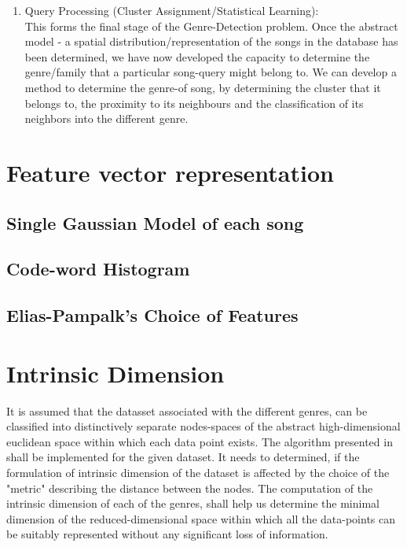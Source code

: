 \documentclass[12pt]{article}
\begin{document}
\begin{enumerate}
\item Query Processing (Cluster Assignment/Statistical Learning):\\
This forms the final stage of the Genre-Detection problem. Once the abstract model - a spatial distribution/representation of the songs in the database has been determined, we have now developed the capacity to determine the genre/family that a particular song-query might belong to. We can develop a method to determine the genre-of song, by determining the cluster that it belongs to, the proximity to its neighbours and the classification of its neighbors into the different genre. 


\end{enumerate}

\section{Feature vector representation}

\subsection{Single Gaussian Model of each song}

\subsection{Code-word Histogram}

\subsection{Elias-Pampalk's Choice of Features}
\section{Intrinsic Dimension}

It is assumed that the datasset associated with the different genres, can be classified into distinctively separate nodes-spaces of the abstract high-dimensional euclidean space within which each data point exists. The algorithm presented in \cite{intrinsicDims} shall be implemented for the given dataset. It needs to determined, if the formulation of intrinsic dimension of the dataset is affected by the choice of the "metric" describing the distance between the nodes. The computation of the intrinsic dimension of each of the genres, shall help us determine the minimal dimension of the reduced-dimensional space within which all the data-points can be suitably represented without any significant loss of information. 
\end{document}
